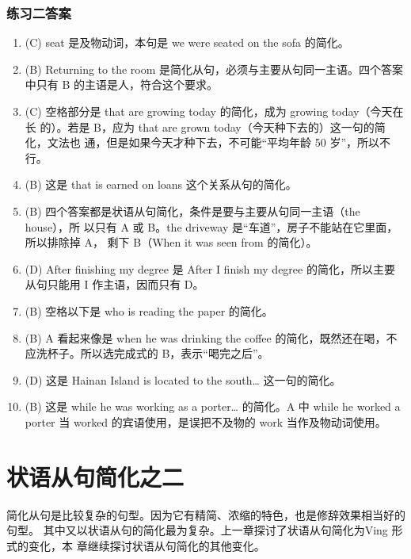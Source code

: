 \subsection{练习二答案}
\begin{enumerate}
\item(C) seat 是及物动词，本句是 we were seated on the sofa 的简化。

\item (B) Returning to the room 是简化从句，必须与主要从句同一主语。四个答案中只有 B 的主语是人，符合这个要求。

\item (C) 空格部分是 that are growing today 的简化，成为 growing today（今天在长
  的）。若是 B，应为 that are grown today（今天种下去的）这一句的简化，文法也
  通，但是如果今天才种下去，不可能“平均年龄 50 岁”，所以不行。

\item (B) 这是 that is earned on loans 这个关系从句的简化。

\item (B) 四个答案都是状语从句简化，条件是要与主要从句同一主语（the house），所
  以只有 A 或 B。the driveway 是“车道”，房子不能站在它里面，所以排除掉 A，
  剩下 B（When it was seen from 的简化）。

\item (D) After finishing my degree 是 After I finish my degree 的简化，所以主要
  从句只能用 I 作主语，因而只有 D。

\item (B) 空格以下是 who is reading the paper 的简化。

\item  (B) A 看起来像是 when he was drinking the coffee 的简化，既然还在喝，不应洗杯子。所以选完成式的 B，表示“喝完之后”。

\item (D) 这是 Hainan Island is located to the south… 这一句的简化。

\item (B) 这是 while he was working as a porter… 的简化。A 中 while he worked
  a porter 当 worked 的宾语使用，是误把不及物的 work 当作及物动词使用。
\end{enumerate}

\chapter{状语从句简化之二}

简化从句是比较复杂的句型。因为它有精简、浓缩的特色，也是修辞效果相当好的句型。
其中又以状语从句的简化最为复杂。上一章探讨了状语从句简化为Ving 形式的变化，本
章继续探讨状语从句简化的其他变化。


